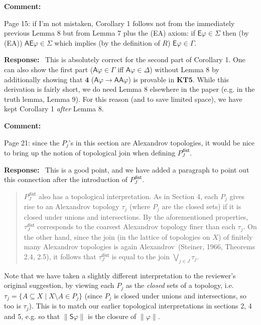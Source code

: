 \documentclass[12pt]{article}
\newenvironment{comment}{
    \noindent\textbf{Comment:}\
    \em
}{\vspace{5mm}}
\newenvironment{response}{
    \noindent\textbf{Response:}\
}{\vspace{5mm}}
\renewcommand{\phi}{\varphi}
\newcommand{\E}{\mathsf{E}}
\newcommand{\A}{\mathsf{A}}
\renewcommand{\S}{\mathsf{S}}
\begin{document}
\begin{comment}
   Page 15: if I’m not mistaken, Corollary 1 follows not from the immediately
   previous Lemma 8 but from Lemma 7 plus the (EA) axiom: if $\E\phi \in
   \Sigma$ then (by (EA)) $\A\E\phi \in \Sigma$ which implies (by the
   definition of $R$) $\E\phi \in \Gamma$.
\end{comment}

\begin{response}
   This is absolutely correct for the second part of Corollary 1. One can also
   show the first part ($\A\phi \in \Gamma$ iff $\A\phi \in \Delta$) without
   Lemma 8 by additionally showing that $\mathbf{4}$ ($\A\phi \rightarrow
   \A\A\phi$) is provable in $\mathbf{KT5}$. While this derivation is fairly
   short, we do need Lemma 8 elsewhere in the paper (e.g. in the truth lemma,
   Lemma 9). For this reason (and to save limited space), we have kept
   Corollary 1 \emph{after} Lemma 8.
\end{response}

\begin{comment}
    Page 21: since the $P_j$'s in this section are Alexandrov topologies, it
    would be nice to bring up the notion of topological join when defining
    $P^\mathsf{dist}_J$.
\end{comment}

\begin{response}
    This is a good point, and we have added a paragraph to point out this
    connection after the introduction of $P^\mathsf{dist}_J$.

    \begin{quotation}
        $P^\mathsf{dist}_J$ also has a topological interpretation. As in
        Section 4, each $P_j$ gives rise to an Alexandrov topology $\tau_j$
        (where $P_j$ are the closed sets) if it is closed under unions and
        intersections. By the aforementioned properties, $\tau^\mathsf{dist}_J$
        corresponds to the coarsest Alexandrov topology finer than each
        $\tau_j$. On the other hand, since the join (in the lattice of
        topologies on $X$) of finitely many Alexandrov topologies is again
        Alexandrov~(Steiner, 1966, Theorems 2.4, 2.5), it follows that
        $\tau^\mathsf{dist}_J$ is equal to the join $\bigvee_{j \in
        J}{\tau_j}$.
    \end{quotation}

    Note that we have taken a slightly different interpretation to the
    reviewer's original suggestion, by viewing each $P_j$ as the \emph{closed}
    sets of a topology, i.e. $\tau_j = \{A \subseteq X \mid X \setminus A \in
    P_j\}$ (since $P_j$ is closed under unions and intersections, so too is
    $\tau_j$). This is to match our earlier topological interpretations in
    sections 2, 4 and 5, e.g. so that $\|\S\phi\|$ is the closure of
    $\|\phi\|$.

\end{response}
\end{document}
